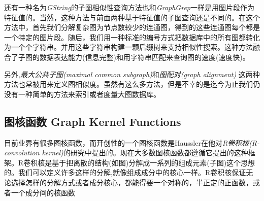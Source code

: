 \documentclass{article}
\begin{document}
还有一种名为\emph{GString}的子图相似性查询方法也和\emph{GraphGrep}一样是用图片段作为特征值的。当然，这种方法与前面两种基于特征值的子图查询还是不同的。在这个方法中，首先我们分解复杂图为节点数较少的连通图，得到的这些连通图每个都是一个特定的图片段。随后，我们用一种标准的编号方式把数据库中的所有图都转化为一个个字符串。并用这些字符串构建一颗后缀树来支持相似性搜索。这种方法融合了子图的数据表达能力(信息完整)和用字符串匹配来查询图的速度(速度快)。

另外,\emph{最大公共子图(maximal common subgraph)}\cite{mcs}和\emph{图配对(graph alignment)}\cite{assignment,assigment08} 这两种方法也常被用来定义图相似度。虽然有这么多方法，但是不幸的是迄今为止我们仍没有一种简单的方法来索引或者度量大图数据库。

\subsection{图核函数 Graph Kernel Functions}
目前业界有很多图核函数，而开创性的一个图核函数是Haussler在他对\emph{R卷积核(R-convolution kernel)}的研究中提出的。现在大多数图核函数都遵循它提出的这种框架。R卷积核是基于把离散的结构(如图)分解成一系列的组成元素(子图)这个思想的。我们可以定义许多这样的分解,就像组成成分中的核心一样。R卷积核保证无论选择怎样的分解方式或者成分核心，都能得要一个对称的，半正定的正函数，或者一个成分间的核函数

\ifx\allfiles\undefined
%
%
\end{document}
